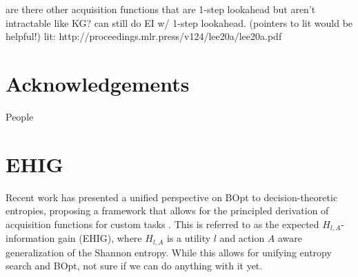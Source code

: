 \documentclass{article}
\theoremstyle{plain}
\theoremstyle{definition}
\theoremstyle{remark}
\begin{document}

are there other acquisition functions that are 1-step lookahead but aren't intractable like KG?
can still do EI w/ 1-step lookahead. (pointers to lit would be helpful!)
lit: http://proceedings.mlr.press/v124/lee20a/lee20a.pdf






\section*{Acknowledgements}
People


\newpage
\appendix
\onecolumn

\section{EHIG}
Recent work has presented a unified perspective on BOpt to decision-theoretic entropies, proposing a framework that allows for the principled derivation of acquisition functions for custom tasks \citep{neiswanger2022generalizing}.
This is referred to as the expected $H_{l,A}$-information gain (EHIG),
where $H_{l,A}$ is a utility $l$ and action $A$ aware generalization of the Shannon entropy.
While this allows for unifying entropy search and BOpt, not sure if we can do anything with it yet.
\end{document}
